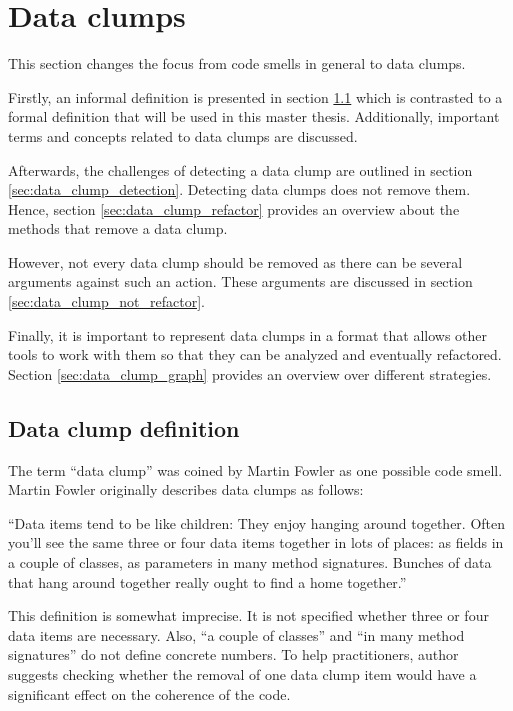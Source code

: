\section{Data clumps}

This section changes the focus from code smells in general to data clumps. 

Firstly, an informal definition is presented in section \ref{sec:data_clump_def} which is contrasted to a formal definition that will be used in this master thesis. Additionally, important terms and concepts related to data clumps are discussed. 

Afterwards, the challenges of detecting a data clump are outlined in section \ref{sec:data_clump_detection}. 
Detecting data clumps does not remove them. Hence, section \ref{sec:data_clump_refactor} provides an overview about the methods that remove a data clump. 

However, not every data clump should be removed as there can be several arguments against such an action. These arguments are discussed in section \ref{sec:data_clump_not_refactor}.

Finally, it is important to represent data clumps in a format that allows other tools to work with them so that they can be analyzed and eventually refactored. Section \ref{sec:data_clump_graph} provides an overview over different strategies. 


\subsection{Data clump definition}\label{sec:data_clump_def}
The term \enquote{data clump} was coined by Martin Fowler as one possible code smell. 
Martin Fowler originally describes data clumps as follows:

\begin{displayquote}
\enquote{Data items tend to be like children: They enjoy hanging around together. Often you'll see
the same three or four data items together in lots of
places: as fields in a couple of classes, as parameters in many
method signatures. Bunches of data that hang around together really ought to find a home together.} \cite{fowler2019refactoring} 
\end{displayquote}


This definition is somewhat imprecise. It is not specified whether three or four data items are necessary. Also, \enquote{a couple of classes} and \enquote{in many method signatures} do not define concrete numbers. To help practitioners,   author suggests checking whether the removal of one data clump item would have a significant effect on the coherence of the code.

